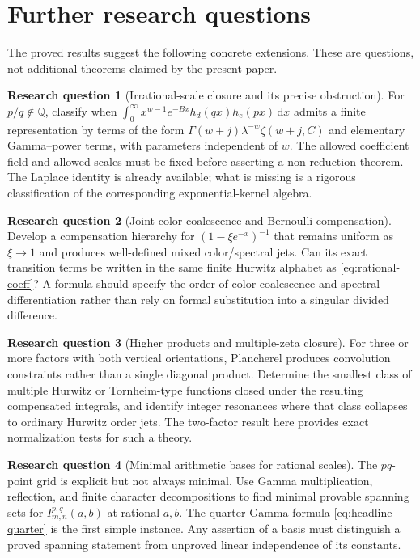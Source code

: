 \documentclass[11pt,a4paper]{article}
\theoremstyle{definition}
\newtheorem{question}{Research question}
\numberwithin{equation}{section}
\newcommand{\dd}{\,\mathrm d}
\begin{document}
\section{Further research questions}
\label{sec:questions}

The proved results suggest the following concrete extensions. These are
questions, not additional theorems claimed by the present paper.

\begin{question}[Irrational-scale closure and its precise obstruction]
For $p/q\notin\mathbb Q$, classify when
$\int_0^\infty x^{w-1}e^{-Bx}h_d(qx)h_e(px)\dd x$ admits a finite
representation by terms of the form
$\Gamma(w+j)\lambda^{-w}\zeta(w+j,C)$ and elementary Gamma--power terms,
with parameters independent of $w$. The allowed coefficient field and
allowed scales must be fixed before asserting a non-reduction theorem.
The Laplace identity is already available; what is missing is a rigorous
classification of the corresponding exponential-kernel algebra.
\end{question}

\begin{question}[Joint color coalescence and Bernoulli compensation]
Develop a compensation hierarchy for
$(1-\xi e^{-x})^{-1}$ that remains uniform as $\xi\to1$ and produces
well-defined mixed color/spectral jets. Can its exact transition terms
be written in the same finite Hurwitz alphabet as
\eqref{eq:rational-coeff}? A formula should specify the order of color
coalescence and spectral differentiation rather than rely on formal
substitution into a singular divided difference.
\end{question}

\begin{question}[Higher products and multiple-zeta closure]
For three or more factors with both vertical orientations, Plancherel
produces convolution constraints rather than a single diagonal product.
Determine the smallest class of multiple Hurwitz or Tornheim-type
functions closed under the resulting compensated integrals, and identify
integer resonances where that class collapses to ordinary Hurwitz order
jets. The two-factor result here provides exact normalization tests for
such a theory.
\end{question}

\begin{question}[Minimal arithmetic bases for rational scales]
The $pq$-point grid is explicit but not always minimal. Use Gamma
multiplication, reflection, and finite character decompositions to find
minimal provable spanning sets for
$I_{m,n}^{p,q}(a,b)$ at rational $a,b$. The quarter-Gamma formula
\eqref{eq:headline-quarter} is the first simple instance. Any assertion
of a basis must distinguish a proved spanning statement from unproved
linear independence of its constants.
\end{question}
\end{document}
